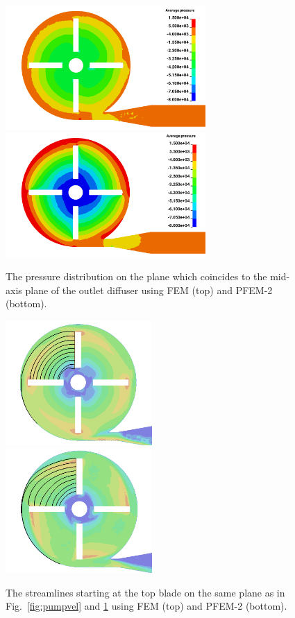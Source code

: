 \begin{figure}[htbp]
    \centering
    \includegraphics[width=3in]{imgs/nozzle_pump/pumppres_fem.png}\\
    \vspace{.5cm}
    \includegraphics[width=3in]{imgs/nozzle_pump/pumppres_pfem.png}
    \caption{The pressure distribution on the plane which coincides to the mid-axis plane of the outlet diffuser using FEM (top) and PFEM-2 (bottom).}
    \label{fig:pumppres}
\end{figure}

\begin{figure}[htbp]
    \centering
    \includegraphics[width=2.2in]{imgs/nozzle_pump/pump_sl_fem.png}\\
    \vspace{.5cm}
    \includegraphics[width=2.2in]{imgs/nozzle_pump/pump_sl_pfem.png}
    \caption{The streamlines starting at the top blade on the same plane as in Fig.~\ref{fig:pumpvel} and \ref{fig:pumppres} using FEM (top) and PFEM-2 (bottom).}
    \label{fig:pumpsl}
\end{figure}

